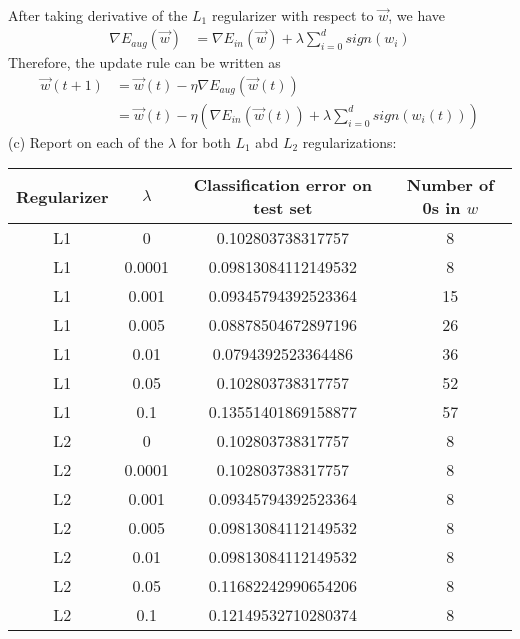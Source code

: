 \documentclass{article}
\begin{document}
    After taking derivative of the $L_1$ regularizer with respect to $\overset{\to}{w}$, we have
    \begin{align*}
        \nabla E_{aug}(\overset{\to}{w}) & = \nabla E_{in}(\overset{\to}{w}) + \lambda \sum_{i=0}^{d} sign(w_i)
    \end{align*}
    Therefore, the update rule can be written as
    \begin{align*}
        \overset{\to}{w}(t+1) & = \overset{\to}{w}(t) - \eta \nabla E_{aug}(\overset{\to}{w}(t))\\
        & = \overset{\to}{w}(t) - \eta (\nabla E_{in}(\overset{\to}{w}(t)) + \lambda \sum_{i=0}^{d} sign(w_i(t)))
    \end{align*}
    (c) Report on each of the $\lambda$ for both $L_1$ abd $L_2$ regularizations:
    \begin{center}
        \begin{tabular}{|c|c|c|c|}
            \hline
            Regularizer & $\lambda$ & Classification error on test set & Number of 0s in $w$\\
            \hline
            L1 & 0 & 0.102803738317757 & 8\\
            \hline
            L1 & 0.0001 & 0.09813084112149532 & 8\\
            \hline
            L1 & 0.001 & 0.09345794392523364 & 15\\
            \hline
            L1 & 0.005 & 0.08878504672897196 & 26\\
            \hline
            L1 & 0.01 & 0.0794392523364486 & 36\\
            \hline
            L1 & 0.05 & 0.102803738317757 & 52\\
            \hline
            L1 & 0.1 & 0.13551401869158877 & 57\\
            \hline
            L2 & 0 & 0.102803738317757 & 8\\
            \hline
            L2 & 0.0001 & 0.102803738317757 & 8\\
            \hline
            L2 & 0.001 & 0.09345794392523364 & 8\\
            \hline
            L2 & 0.005 & 0.09813084112149532 & 8\\
            \hline
            L2 & 0.01 & 0.09813084112149532 & 8\\
            \hline
            L2 & 0.05 & 0.11682242990654206 & 8\\
            \hline
            L2 & 0.1 & 0.12149532710280374 & 8\\
            \hline
        \end{tabular}
    \end{center}
\end{document}
